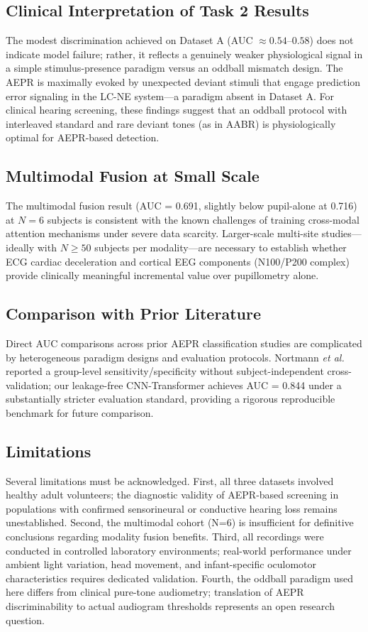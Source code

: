 \documentclass[journal]{IEEEtran}
\begin{document}
\subsection{Clinical Interpretation of Task 2 Results}
The modest discrimination achieved on Dataset A (AUC $\approx 0.54\text{--}0.58$) does not indicate model failure; rather, it reflects a genuinely weaker physiological signal in a simple stimulus-presence paradigm versus an oddball mismatch design. The AEPR is maximally evoked by unexpected deviant stimuli that engage prediction error signaling in the LC-NE system—a paradigm absent in Dataset A. For clinical hearing screening, these findings suggest that an oddball protocol with interleaved standard and rare deviant tones (as in AABR) is physiologically optimal for AEPR-based detection.

\subsection{Multimodal Fusion at Small Scale}
The multimodal fusion result (AUC = 0.691, slightly below pupil-alone at 0.716) at $N = 6$ subjects is consistent with the known challenges of training cross-modal attention mechanisms under severe data scarcity. Larger-scale multi-site studies—ideally with $N \geq 50$ subjects per modality—are necessary to establish whether ECG cardiac deceleration and cortical EEG components (N100/P200 complex) provide clinically meaningful incremental value over pupillometry alone.

\subsection{Comparison with Prior Literature}
Direct AUC comparisons across prior AEPR classification studies are complicated by heterogeneous paradigm designs and evaluation protocols. Nortmann \textit{et al.} \cite{nortmann2020screening} reported a group-level sensitivity/specificity without subject-independent cross-validation; our leakage-free CNN-Transformer achieves AUC = 0.844 under a substantially stricter evaluation standard, providing a rigorous reproducible benchmark for future comparison.

\subsection{Limitations}
Several limitations must be acknowledged. First, all three datasets involved healthy adult volunteers; the diagnostic validity of AEPR-based screening in populations with confirmed sensorineural or conductive hearing loss remains unestablished. Second, the multimodal cohort (N=6) is insufficient for definitive conclusions regarding modality fusion benefits. Third, all recordings were conducted in controlled laboratory environments; real-world performance under ambient light variation, head movement, and infant-specific oculomotor characteristics requires dedicated validation. Fourth, the oddball paradigm used here differs from clinical pure-tone audiometry; translation of AEPR discriminability to actual audiogram thresholds represents an open research question.
\end{document}

